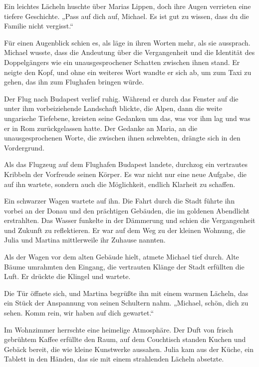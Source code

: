 \documentclass[
]{article}
\begin{document}
Ein leichtes Lächeln huschte über Marias Lippen, doch ihre Augen verrieten eine tiefere Geschichte. „Pass auf dich auf, Michael. Es ist gut zu wissen, dass du die Familie nicht vergisst.``

Für einen Augenblick schien es, als läge in ihren Worten mehr, als sie aussprach. Michael wusste, dass die Andeutung über die Vergangenheit und die Identität des Doppelgängers wie ein unausgesprochener Schatten zwischen ihnen stand. Er neigte den Kopf, und ohne ein weiteres Wort wandte er sich ab, um zum Taxi zu gehen, das ihn zum Flughafen bringen würde.



Der Flug nach Budapest verlief ruhig. Während er durch das Fenster auf die unter ihm vorbeiziehende Landschaft blickte, die Alpen, dann die weite ungarische Tiefebene, kreisten seine Gedanken um das, was vor ihm lag und was er in Rom zurückgelassen hatte. Der Gedanke an Maria, an die unausgesprochenen Worte, die zwischen ihnen schwebten, drängte sich in den Vordergrund.

Als das Flugzeug auf dem Flughafen Budapest landete, durchzog ein vertrautes Kribbeln der Vorfreude seinen Körper. Es war nicht nur eine neue Aufgabe, die auf ihn wartete, sondern auch die Möglichkeit, endlich Klarheit zu schaffen.

Ein schwarzer Wagen wartete auf ihn. Die Fahrt durch die Stadt führte ihn vorbei an der Donau und den prächtigen Gebäuden, die im goldenen Abendlicht erstrahlten. Das Wasser funkelte in der Dämmerung und schien die Vergangenheit und Zukunft zu reflektieren. Er war auf dem Weg zu der kleinen Wohnung, die Julia und Martina mittlerweile ihr Zuhause nannten.

Als der Wagen vor dem alten Gebäude hielt, atmete Michael tief durch. Alte Bäume umrahmten den Eingang, die vertrauten Klänge der Stadt erfüllten die Luft. Er drückte die Klingel und wartete.



Die Tür öffnete sich, und Martina begrüßte ihn mit einem warmen Lächeln, das ein Stück der Anspannung von seinen Schultern nahm. „Michael, schön, dich zu sehen. Komm rein, wir haben auf dich gewartet.``

Im Wohnzimmer herrschte eine heimelige Atmosphäre. Der Duft von frisch gebrühtem Kaffee erfüllte den Raum, auf dem Couchtisch standen Kuchen und Gebäck bereit, die wie kleine Kunstwerke aussahen. Julia kam aus der Küche, ein Tablett in den Händen, das sie mit einem strahlenden Lächeln absetzte.
\end{document}
